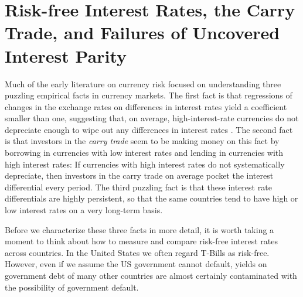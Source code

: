 \section{Risk-free Interest Rates, the Carry Trade, and Failures of
  Uncovered Interest Parity}

Much of the early literature on currency risk focused on understanding three
puzzling empirical facts in currency markets. The first fact is that
regressions of changes in the exchange rates on differences in
interest rates yield a coefficient smaller than one, suggesting that,
on average, high-interest-rate currencies do not depreciate enough to
wipe out any differences in interest rates \citep{Bilson1981, Fama1984}.
The second fact is that investors in the \textit{carry trade} seem to be
making money on this fact by borrowing in currencies with low interest
rates and lending in currencies with high interest rates: If
currencies with high interest rates do not systematically depreciate,
then investors in the carry trade on average pocket the interest
differential every period. The third puzzling fact is that these
interest rate differentials are highly persistent, so that the same
countries tend to have high or low interest rates on a very long-term
basis.

Before we characterize these three facts in more detail, it is worth
taking a moment to think about how to measure and compare risk-free
interest rates across countries. In the United States we often regard
T-Bills as risk-free. However, even if we assume the US government
cannot default, yields on government debt of many other countries are
almost certainly contaminated with the possibility of government
default.

